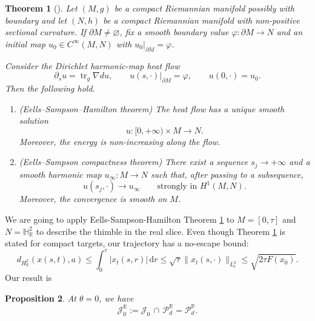 \documentclass[11pt]{amsart}
\theoremstyle{plain}
\newtheorem{thm}{Theorem}[section]
\newtheorem{prop}[thm]{Proposition}
\theoremstyle{definition}
\newcommand{\R}{\mathbb{R}}
\newcommand{\dd}{\mathrm d}
\newcommand{\HH}{\mathbb{H}}
\begin{document}
\begin{thm}[{\cite{ES,Ham}}]
\label{thm:eells-sampson-closed}
Let $(M,g)$ be a compact Riemannian manifold possibly with boundary and let $(N,h)$ be a compact
Riemannian manifold with non-positive sectional curvature. If $\partial M\neq\varnothing$, fix a
smooth boundary value $\varphi:\partial M\to N$ and an initial map
$u_0\in C^\infty(M,N)$ with $u_0|_{\partial M}=\varphi$.

Consider the Dirichlet harmonic-map heat flow
\[
\partial_s u=\operatorname{tr}_g\nabla du,
\qquad u(s,\cdot)|_{\partial M}=\varphi,\qquad 
u(0,\cdot)=u_0.
\]
Then the following hold.

\begin{enumerate}
\item[\textup{(1)}]
\textup{(Eells--Sampson--Hamilton theorem)}
The heat flow has a unique smooth solution
\[
u:[0,+\infty)\times M\to N .
\]
Moreover, the energy is non-increasing along the flow.

\item[\textup{(2)}]
\textup{(Eells--Sampson compactness theorem)} There exist a sequence $s_j\to+\infty$ and a smooth harmonic map
$u_\infty:M\to N$ such that, after passing to a subsequence,
\[
u(s_j,\cdot)\longrightarrow u_\infty
\qquad\text{strongly in }H^1(M,N).
\]
Moreover, the convergence is smooth on $M$. 
\end{enumerate}
\end{thm}


We are going to apply Eells-Sampson-Hamilton Theorem \ref{thm:eells-sampson-closed} to $M=[0,\tau]$ and $N=\HH_{\R}^2$ to describe the thimble in the real slice. Even though Theorem \ref{thm:eells-sampson-closed} is stated for compact targets, our trajectory has a no-escape bound:
\[
d_{H^2_{\R}}(x(s,t),a)\le
\int_0^\tau |x_t(s,r)|\,\dd r\le
\sqrt{\tau}\|x_t(s,\cdot)\|_{L^2_t}\le
\sqrt{2\tau F(x_0)}.
\]
Our result is
 
\begin{prop}\label{prop:real-thimble}
At $\theta=0$, we have
\[\mathcal{J}_{0}^{\R}:=\mathcal{J}_0\,\cap\,\mathcal{P}_d^{\R}=\mathcal{P}_d^{\R}.\]
\end{prop}
\end{document}
